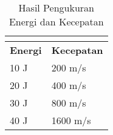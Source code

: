 \begin{longtable}{|l|l|}
	\caption{Hasil Pengukuran Energi dan Kecepatan}
	\vspace{1.5ex}
	\label{tb:energiKecepatan}\\
	\hline
	\rowcolor[HTML]{C0C0C0}
	\textbf{Energi} & \textbf{Kecepatan} \\ \hline
	10 J & 200 m/s \\ \hline
	20 J & 400 m/s \\ \hline
	30 J & 800 m/s \\ \hline
	40 J & 1600 m/s \\ \hline
\end{longtable}